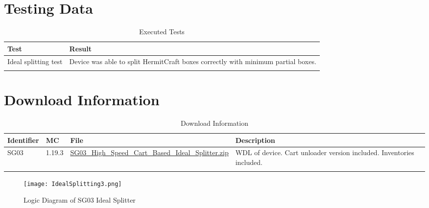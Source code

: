 \documentclass[10pt]{datasheet}
\begin{document}
\newpage
\section{Testing Data}
\begin{table}[h]
\caption{Executed Tests}
\begin{tabularx}{\textwidth}{l | X}
    \thickhline
    \textbf{Test} & \textbf{Result} \\
    \hline
    Ideal splitting test & Device was able to split HermitCraft boxes correctly with minimum partial boxes. \\
    \thickhline
\end{tabularx}
\end{table}

\section{Download Information}
\begin{table}[h]
    \caption{Download Information}
    \begin{tabularx}{\textwidth}{l | l | l | X}
        \thickhline
        \textbf{Identifier} & \textbf{MC} & \textbf{File} & \textbf{Description} \\
        \hline
        SG03 & 1.19.3 & \href{https://github.com/Soontech-Annals/Archive/blob/b56572c0d2b4f182d9e9d41449d8cb2963b923ae/Archive/splitting/SG03\%20High\%20Speed\%20Cart\%20Based\%20Ideal\%20Splitter/SG03\_High\_Speed\_Cart\_Based\_Ideal\_Splitter.zip?raw=1}{SG03\_High\_Speed\_Cart\_Based\_Ideal\_Splitter.zip} & WDL of device. Cart unloader version included. Inventories included. \\
        \hline
        \thickhline
    \end{tabularx}
\end{table}

\newpage
\begin{figure}
    \texttt{[image: IdealSplitting3.png]}
    \caption{\centering Logic Diagram of SG03 Ideal Splitter}
\end{figure}
\end{document}
